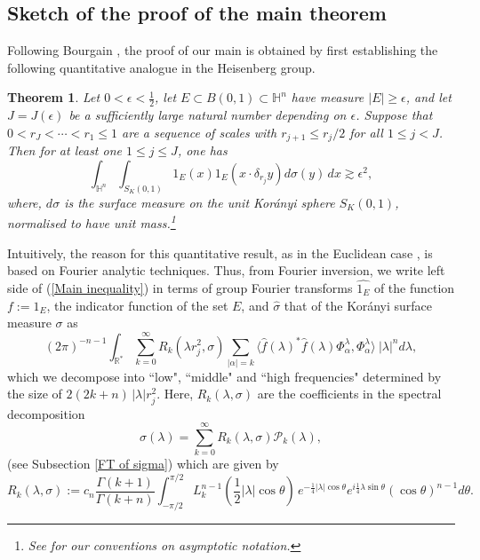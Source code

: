 \documentclass[11pt, reqno]{amsart}
\theoremstyle{plain}
\newtheorem{theorem}{Theorem}[section]
\newcommand{\R}{\ensuremath{\mathbb{R_+}}}
\theoremstyle{remark}
\theoremstyle{example}
\theoremstyle{definition}
\numberwithin{equation}{section}
\def\R{\mathbb{R}}
\def\H{\mathbb{H}}
\begin{document}
\subsection{Sketch of the proof of the main theorem} Following Bourgain \cite{1986Bourgain}, the proof of our main   is obtained by first establishing the following quantitative analogue in the Heisenberg group.
\begin{theorem}%
\label{FKW-quantitative}
Let $0< \epsilon< \frac{1}{2}$, let $E \subset  B(0,1) \subset \H^n$ have measure $|E| \geq \epsilon$, and let $J=J(\epsilon)$ be a sufficiently large natural number depending on $\epsilon$. Suppose that $0 < r_{J} < \cdots < r_{1} \leq 1 $ are a sequence of scales with $r_{j+1} \leq r_{j}/2$ for all $1 \leq j < J$. Then for at least one $1 \leq j \leq J$, one has
\begin{equation}\label{Main inequality}
    \int_{\H^n} \int_{S_{K}(0,1)} 1_{E}(x) 1_{E}( x \cdot \delta_{r_{j}}y ) d \sigma(y) \,  dx \gtrsim \epsilon^{2},
\end{equation}
where, $d \sigma$ is the surface measure on the unit Kor\'anyi sphere $S_{K}(0,1)$, normalised to have unit mass.\footnote{See  for our conventions on asymptotic notation.} 
\end{theorem}
Intuitively, the reason for this quantitative result, as in the Euclidean case \cite{1986Bourgain}, is based on Fourier analytic techniques. Thus, from Fourier inversion, we write left side of (\ref{Main inequality}) in terms of group Fourier transforms $\widehat{1_{E}}$ of the function $f:=1_{E}$, the indicator function of the set $E$, and $\widehat{\sigma}$ that of the Kor\'anyi surface measure  $\sigma$ as 
\begin{equation}\label{total integral}
    (2\pi)^{-n-1}  \int_{\R^{*}} \sum_{k=0}^{\infty} R_{k}(\lambda r_{j}^{2},\sigma) \sum_{|\alpha|=k} \langle \hat{f}(\lambda)^{*} \hat{f}(\lambda) \Phi_{\alpha}^{\lambda},\Phi_{\alpha}^{\lambda} \rangle \ |\lambda|^n d\lambda,
\end{equation}
which we decompose into ``low", ``middle" and ``high frequencies" determined by the size of $2(2k+n) \, |\lambda| r_{j}^2$. Here, $R_{k}(\lambda, \sigma)$  are the coefficients in the spectral decomposition $$\widehat{\sigma}(\lambda)= \sum_{k=0}^{\infty} R_{k}(\lambda, \sigma) \mathcal{P}_{k}(\lambda),$$ (see Subsection \ref{FT of sigma}) which are given by
\begin{equation*}
    R_{k}(\lambda, \sigma):= c_{n} \frac{\Gamma(k+1)}{\Gamma(k+n)} \int_{- \pi/2}^{\pi/2} L_{k}^{n-1} \left( {\textstyle\frac{1}{2} } |\lambda |    \cos{\theta}  \right) \, e^{-\frac{1}{4}  |\lambda|  \cos{\theta}}  e^{i \frac{1}{4} \lambda \sin{\theta}} (\cos{\theta})^{n-1} d \theta.
\end{equation*}
\end{document}
